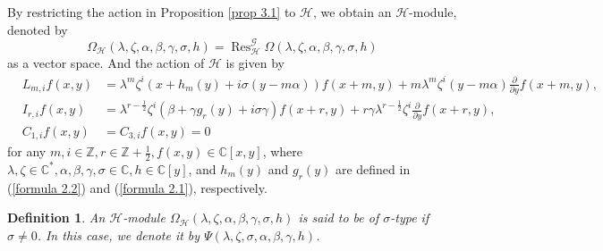 \documentclass[12pt,reqno]{amsart}
\def\Z{\mathbb{Z}}
\def\C{\mathbb{C}}
\numberwithin{equation}{section}
\newtheorem{defi}[theo]{Definition}
\begin{document}
By restricting the action in Proposition \ref{prop 3.1} to $\mathcal{H}$, we obtain an $\mathcal{H}$-module, denoted by $$\Omega_{\mathcal{H}}(\lambda,\zeta,\alpha,\beta,\gamma,\sigma,h)=\operatorname{Res}_{\mathcal{H}}^{\mathcal{G}}\Omega(\lambda, \zeta,\alpha,\beta,\gamma,\sigma,h)$$ as a vector space. And the action of $\mathcal{H}$ is given by
\begin{eqnarray}\label{act. def 6.1}
&L_{m,i} f(x,y)&=\lambda^m\zeta^i(x+h_{m}(y)+i\sigma(y-m\alpha))f(x+m,y)+m\lambda^m\zeta^i(y-m\alpha)\frac{\partial }{\partial {y}}{f(x+m,y)},\nonumber\\
&I_{r,i} f(x,y)&=\lambda^{r-\frac{1}{2}}\zeta^i(\beta+\gamma g_{r}(y)+i\sigma \gamma)f(x+r,y)+r\gamma\lambda^{r-\frac{1}{2}}\zeta^i\frac{\partial }{\partial {y}}{f(x+r,y)},\\ 
&C_{1,i}f(x,y)&=C_{3,i}f(x,y)=0\nonumber 
\end{eqnarray}
for any $m,i\in\Z,r\in\Z+\frac{1}{2}, f(x,y)\in\C[x,y]$, where $\lambda,\zeta\in\C^*,\alpha,\beta,\gamma,\sigma\in\C,h\in \C[y]$, and $h_m(y)$ and $g_r(y)$ are defined in (\ref{formula 2.2}) and (\ref{formula 2.1}), respectively.

\begin{defi}\label{def 5.1}
    An $\mathcal{H}$-module $\Omega_{\mathcal{H}}(\lambda,\zeta,\alpha,\beta,\gamma,\sigma,h)$ is said to be of $\sigma$-type if $\sigma\neq0$. In this case, we denote it by  $\Psi(\lambda,\zeta,\sigma,\alpha,\beta,\gamma,h)$.
\end{defi}
\end{document}
